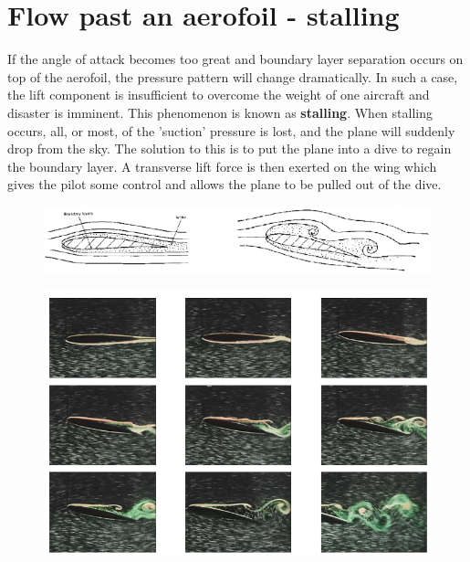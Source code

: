 \documentclass[class=report, crop=false, 12pt,a4paper]{standalone}
\begin{document}
\section{Flow past an aerofoil - stalling}
If the angle of attack becomes too great and boundary layer separation occurs on top of the aerofoil, the pressure pattern will change dramatically. In such a case, the lift component is insufficient to overcome the weight of one aircraft and disaster is imminent. This phenomenon is known as \textbf{stalling}. When stalling occurs, all, or most, of the 'suction' pressure is lost, and the plane will suddenly drop from the sky. The solution to this is to put the plane into a dive to regain the boundary layer. A transverse lift force is then exerted on the wing which gives the pilot some control and allows the plane to be pulled out of the dive.
\begin{figure}[H]
  \centering
  \includegraphics[width = \textwidth]{../img/diagram60.png}
\end{figure}
\begin{figure}[H]
  \centering
  \includegraphics[width =0.7 \textwidth]{../img/diagram61.png}
\end{figure}
\end{document}
